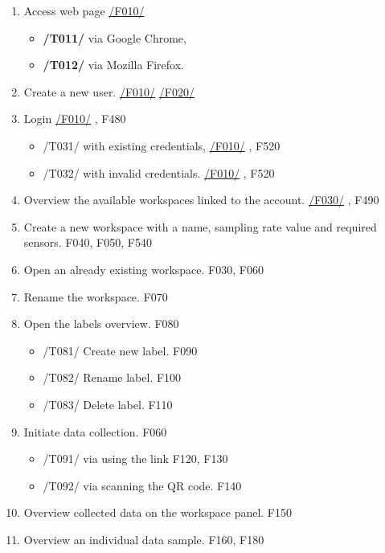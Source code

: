 \begin{enumerate}[{label = \textbf{/T{\protect\twodigits{\arabic{enumi}}}0/}, leftmargin = *}]
    \item Access web page \hyperref[welcome_page]{/F010/}
    \begin{itemize}
        \item \textbf{/T011/} via Google Chrome,
        \item \textbf{/T012/} via Mozilla Firefox.
    \end{itemize}
    \item Create a new user. \hyperref[welcome_page]{/F010/} \hyperref[registration_panel]{/F020/}
    \item Login \hyperref[welcome_page]{/F010/} , F480
    \begin{itemize}
        \item /T031/ with existing credentials, \hyperref[welcome_page]{/F010/} , F520
        \item /T032/ with invalid credentials. \hyperref[welcome_page]{/F010/} , F520
    \end{itemize}
    \item Overview the available workspaces linked to the account. \hyperref[workspaces_ov]{/F030/} , F490
    \item Create a new workspace with a name, sampling rate value and required sensors. F040, F050, F540
    \item Open an already existing workspace. F030, F060
    \item Rename the workspace. F070
    \item Open the labels overview. F080
    \begin{itemize}
        \item /T081/ Create new label. F090
        \item /T082/ Rename label. F100
        \item /T083/ Delete label. F110
    \end{itemize}
    \item Initiate data collection. F060
    \begin{itemize}
        \item /T091/ via using the link F120, F130
        \item /T092/ via scanning the QR code. F140
    \end{itemize}
    \item Overview collected data on the workspace panel. F150
    \item Overview an individual data sample. F160, F180

\end{enumerate}
